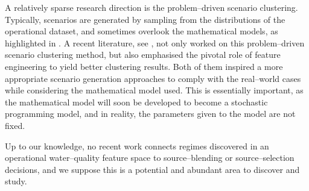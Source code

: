 A relatively sparse research direction is the problem–driven scenario clustering. Typically, scenarios are generated by sampling from the distributions of the operational dataset, and sometimes overlook the mathematical models, as highlighted in \cite{ref_23}.
A recent literature, see \cite{ref_22}, not only worked on this problem–driven scenario clustering method, but also emphasised the pivotal role of feature engineering to yield better clustering results. Both of them inspired a more appropriate scenario generation approaches to comply with the real–world cases while considering the mathematical model used.
This is essentially important, as the mathematical model will soon be developed to become a stochastic programming model, and in reality, the parameters given to the model are not fixed.

Up to our knowledge, no recent work connects regimes discovered in an operational water–quality feature space to source–blending or source–selection decisions, and we suppose this is a potential and abundant area to discover and study.

